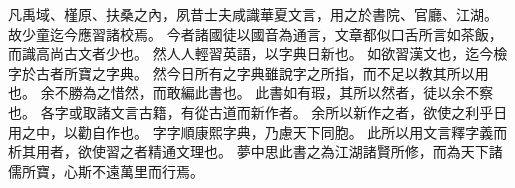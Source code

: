 凡禹域、槿原、扶桑之內，夙昔士夫咸識華夏文言，用之於書院、官廳、江湖。
故少童迄今應習諸校焉。
今者諸國徒以國音為通言，文章都似口舌所言如茶飯，而識高尚古文者少也。
然人人輕習英語，以字典日新也。
如欲習漢文也，迄今檢字於古者所寶之字典。
然今日所有之字典雖說字之所指，而不足以教其所以用也。
余不勝為之惜然，而敢編此書也。
此書如有瑕，其所以然者，徒以余不察也。
各字或取諸文言古籍，有從古道而新作者。
余所以新作之者，欲使之利乎日用之中，以勸自作也。
字字順康熙字典，乃慮天下同胞。
此所以用文言釋字義而析其用者，欲使習之者精通文理也。
夢中思此書之為江湖諸賢所修，而為天下諸儒所寶，心斯不遠萬里而行焉。
